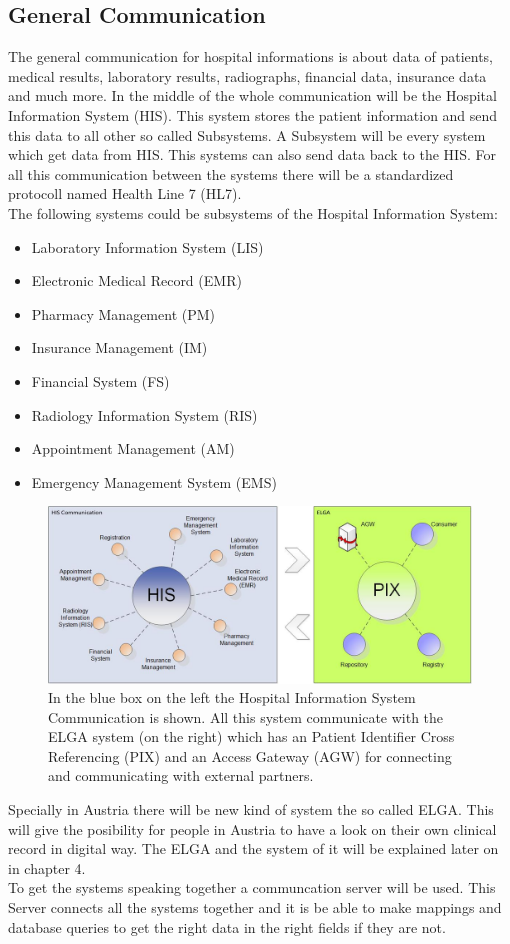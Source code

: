 \documentclass[a4paper]{article}
\begin{document}
	\subsection{General Communication}
		The general communication for hospital informations is about data of patients,
		medical results, laboratory results, radiographs, financial data, insurance
		data and much more. In the middle of the whole communication will be the
		Hospital Information System (HIS). This system stores the patient information
		and send this data to all other so called Subsystems. A Subsystem will be
		every system which get data from HIS. This systems can also send data back to
		the HIS. For all this communication between the systems there will be a
		standardized protocoll named Health Line 7 (HL7).\\
		The following systems could be subsystems of the Hospital Information System:
		\begin{itemize}
	    	\item Laboratory Information System (LIS)
	    	\item Electronic Medical Record (EMR)
	    	\item Pharmacy Management (PM)
	    	\item Insurance Management (IM)
	    	\item Financial System (FS)
	    	\item Radiology Information System (RIS)
	    	\item Appointment Management (AM)
	    	\item Emergency Management System (EMS)
	    \end{itemize}
	    \begin{figure}[!ht]
		  \centering
		      \includegraphics[width=1.0\textwidth]{HIS_Overview}
		  \caption{In the blue box on the left the Hospital Information System
		  Communication is shown. All this system communicate with the ELGA system
		  (on the right) which has an Patient Identifier Cross Referencing (PIX) and
		  an Access Gateway (AGW) for connecting and communicating with external
		  partners.}
		\end{figure}
	    Specially in Austria there will be new kind of system the so called ELGA.
	    This will give the posibility for people in Austria to have a look on their
	    own clinical record in digital way. The ELGA and the system of it will be
	    explained later on in chapter 4.\\
	    To get the systems speaking together a communcation server will be used.
	    This Server connects all the systems together and it is be able to make
	    mappings and database queries to get the right data in the right fields if
	    they are not.
\end{document}
